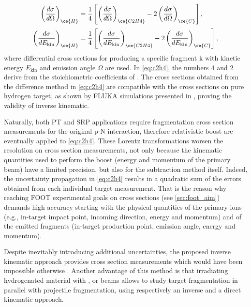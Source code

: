 \begin{equation}
	\begin{aligned}
		\left(\frac{d\sigma}{d\Omega}\right)_{\ce{H}}
		&=
		\frac{1}{4}
		\left[
		\left(\frac{d\sigma}{d\Omega}\right)_{\ce{C2H4}}
		-
		2\left(\frac{d\sigma}{d\Omega}\right)_{\ce{C}}
		\right],
		\\[0.5ex]
		\left(\frac{d\sigma}{dE_{\text{kin}}}\right)_{\ce{H}}
		&=
		\frac{1}{4}
		\left[
		\left(\frac{d\sigma}{dE_{\text{kin}}}\right)_{\ce{C2H4}}
		-
		2\left(\frac{d\sigma}{dE_{\text{kin}}}\right)_{\ce{C}}
		\right],
	\end{aligned}
	\label{eq:c2h4}
\end{equation}
where differential cross sections for producing a specific fragment $\text{k}$ with kinetic energy $E_{\text{kin}}$ and emission angle $\Omega$ are used. In \autoref{eq:c2h4}, the numbers $4$ and $2$ derive from the stoichiometric coefficients of . The cross sections obtained from the difference method in \autoref{eq:c2h4} are compatible with the cross sections on pure hydrogen target, as shown by FLUKA simulations \cite{Ferrari:2005zk,BOHLEN2014211} presented in \cite{foot_cdr}, proving the validity of inverse kinematic.

Naturally, both PT and SRP applications require fragmentation cross section measurements for the original p-N interaction, therefore relativistic boost are eventually applied to \autoref{eq:c2h4}. These Lorentz transformations worsen the resolution on cross section measurements, not only because the kinematic quantities used to perform the boost (energy and momentum of the primary beam) have a limited precision, but also for the subtraction method itself. Indeed, the uncertainty propagation in \autoref{eq:c2h4} results in a quadratic sum of the errors obtained from each individual target measurement. That is the reason why reaching FOOT experimental goals on cross sections (see \autoref{sec:foot_aim}) demands high accuracy starting with the physical quantities of the primary ions (e.g., in-target impact point, incoming direction, energy and momentum) and of the emitted fragments (in-target production point, emission angle, energy and momentum).

Despite inevitably introducing additional uncertainties, the proposed inverse kinematic approach provides cross section measurements which would have been impossible otherwise \cite{measurement_impact_foot}. Another advantage of this method is that irradiating hydrogenated material with ,  or  beams allows to study target fragmentation in parallel with projectile fragmentation, using respectively an inverse and a direct kinematic approach.
